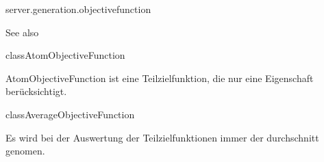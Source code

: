 \begin{texdocpackage}{server.generation.objectivefunction}
\label{texdoclet:edu.kit.informatik.studyplan.server.generation.objectivefunction}

\begin{texdocsees}{See also}
\end{texdocsees}
\begin{texdocclass}{class}{AtomObjectiveFunction}
\label{texdoclet:edu.kit.informatik.studyplan.server.generation.objectivefunction.AtomObjectiveFunction}
\begin{texdocclassintro}
AtomObjectiveFunction ist eine Teilzielfunktion, die nur eine Eigenschaft
 berücksichtigt.\end{texdocclassintro}
\begin{texdocclassconstructors}
\end{texdocclassconstructors}
\begin{texdocclassmethods}
\end{texdocclassmethods}
\end{texdocclass}


\begin{texdocclass}{class}{AverageObjectiveFunction}
\label{texdoclet:edu.kit.informatik.studyplan.server.generation.objectivefunction.AverageObjectiveFunction}
\begin{texdocclassintro}
Es wird bei der Auswertung der Teilzielfunktionen immer der durchschnitt genomen.\end{texdocclassintro}
\begin{texdocclassconstructors}
\end{texdocclassconstructors}
\begin{texdocclassmethods}
\end{texdocclassmethods}
\end{texdocclass}



\end{texdocpackage}
